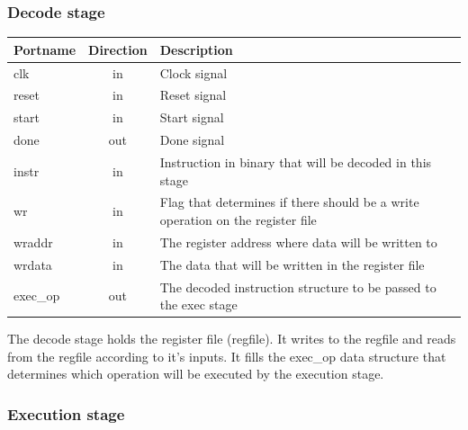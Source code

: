 \subsubsection{Decode stage}

\begin{center}
	\begin{tabular}{ | l | c | l | }
		\hline
		\textbf{Portname} & \textbf{Direction} & \textbf{Description} \\
		\hline
		clk & in & Clock signal \\
		reset & in  & Reset signal \\
		start & in  & Start signal \\
		done & out  & Done signal \\
		instr & in  & Instruction in binary that will be decoded in this stage \\
		wr & in  & Flag that determines if there should be a write operation on the register file \\
		wraddr & in  & The register address where data will be written to \\
		wrdata & in  & The data that will be written in the register file  \\
		exec\_op & out  & The decoded instruction structure to be passed to the exec stage \\
		\hline
	\end{tabular} 
\end{center}

The decode stage holds the register file (regfile). It writes to the regfile and reads from the regfile according to it's inputs. It fills the exec\_op data structure that determines which operation will be executed by the execution stage.

\subsubsection{Execution stage}


